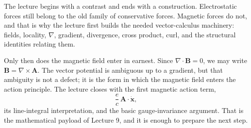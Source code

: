 The lecture begins with a contrast and ends with a construction. Electrostatic forces still belong to the old family of conservative forces. Magnetic forces do not, and that is why the lecture first builds the needed vector-calculus machinery: fields, locality, \(\nabla\), gradient, divergence, cross product, curl, and the structural identities relating them.

Only then does the magnetic field enter in earnest. Since \(\nabla\cdot \mathbf B=0\), we may write \(\mathbf B=\nabla\times \mathbf A\). The vector potential is ambiguous up to a gradient, but that ambiguity is not a defect; it is the form in which the magnetic field enters the action principle. The lecture closes with the first magnetic action term,
\[
\frac{e}{c}\,\mathbf A\cdot \dot{\mathbf x},
\]
its line-integral interpretation, and the basic gauge-invariance argument. That is the mathematical payload of Lecture 9, and it is enough to prepare the next step.